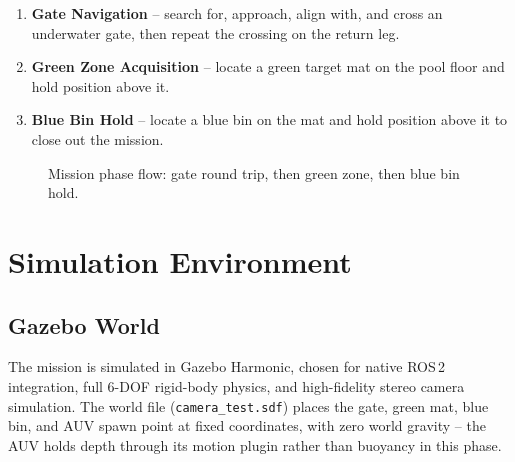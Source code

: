 \documentclass[11pt,a4paper]{article}
\newcommand{\nl}{\newline}
\begin{document}
\begin{enumerate}[leftmargin=1.6em]
  \item \textbf{Gate Navigation} -- search for, approach, align with, and cross an
    underwater gate, then repeat the crossing on the return leg.
  \item \textbf{Green Zone Acquisition} -- locate a green target mat on the pool
    floor and hold position above it.
  \item \textbf{Blue Bin Hold} -- locate a blue bin on the mat and hold position
    above it to close out the mission.
\end{enumerate}

\begin{figure}[H]
\centering
{}
\caption{Mission phase flow: gate round trip, then green zone, then blue bin hold.}
\end{figure}

\section{Simulation Environment}

\subsection{Gazebo World}

The mission is simulated in Gazebo Harmonic, chosen for native ROS\,2
integration, full 6-DOF rigid-body physics, and high-fidelity stereo camera
simulation. The world file (\texttt{camera\_test.sdf}) places the gate, green
mat, blue bin, and AUV spawn point at fixed coordinates, with zero world
gravity -- the AUV holds depth through its motion plugin rather than buoyancy
in this phase.
\end{document}
